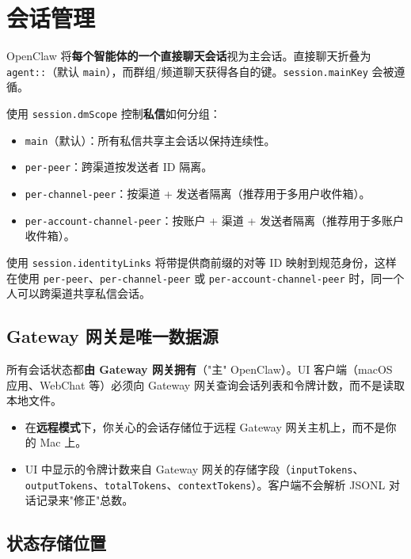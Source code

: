 \clearpage

\section{会话管理}


OpenClaw 将\textbf{每个智能体的一个直接聊天会话}视为主会话。直接聊天折叠为 \texttt{agent::}（默认 \texttt{main}），而群组/频道聊天获得各自的键。\texttt{session.mainKey} 会被遵循。

使用 \texttt{session.dmScope} 控制\textbf{私信}如何分组：

\begin{itemize}
  \item \texttt{main}（默认）：所有私信共享主会话以保持连续性。
  \item \texttt{per-peer}：跨渠道按发送者 ID 隔离。
  \item \texttt{per-channel-peer}：按渠道 + 发送者隔离（推荐用于多用户收件箱）。
  \item \texttt{per-account-channel-peer}：按账户 + 渠道 + 发送者隔离（推荐用于多账户收件箱）。
\end{itemize}

使用 \texttt{session.identityLinks} 将带提供商前缀的对等 ID 映射到规范身份，这样在使用 \texttt{per-peer}、\texttt{per-channel-peer} 或 \texttt{per-account-channel-peer} 时，同一个人可以跨渠道共享私信会话。

\subsection{Gateway 网关是唯一数据源}


所有会话状态都\textbf{由 Gateway 网关拥有}（"主" OpenClaw）。UI 客户端（macOS 应用、WebChat 等）必须向 Gateway 网关查询会话列表和令牌计数，而不是读取本地文件。

\begin{itemize}
  \item 在\textbf{远程模式}下，你关心的会话存储位于远程 Gateway 网关主机上，而不是你的 Mac 上。
  \item UI 中显示的令牌计数来自 Gateway 网关的存储字段（\texttt{inputTokens}、\texttt{outputTokens}、\texttt{totalTokens}、\texttt{contextTokens}）。客户端不会解析 JSONL 对话记录来"修正"总数。
\end{itemize}


\subsection{状态存储位置}


